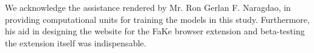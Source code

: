 \documentclass[conference]{IEEEtran}
\begin{document}
We acknowledge the assistance rendered by Mr. Ron Gerlan F. Naragdao, in providing computational units for training the models in this study. Furthermore, his aid in designing the website for the FaKe browser extension and beta-testing the extension itself was indispensable.




\end{document}
